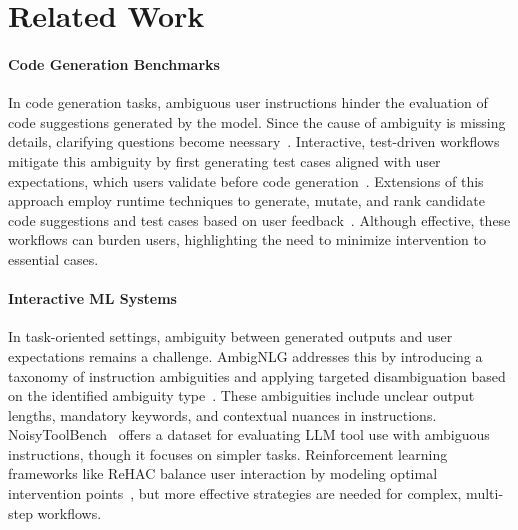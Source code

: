 \section{Related Work}
\label{sec:RelatedWorks}

\paragraph{Code Generation Benchmarks}
In code generation tasks,
ambiguous user instructions hinder the evaluation of code
suggestions generated by the model. Since the cause of
ambiguity is missing details, clarifying questions become
neessary~\cite{mu2023clarifygptempoweringllmbasedcode}. Interactive, test-driven workflows mitigate this ambiguity by first generating test cases aligned with user expectations, which users validate before code generation~\cite{lahiri2023interactivecodegenerationtestdriven}. Extensions of this approach employ runtime techniques to generate, mutate, and rank candidate code suggestions and test cases based on user feedback~\cite{Fakhoury_2024_LLM_Code_Gen}. Although effective, these workflows can burden users, highlighting the need to minimize intervention to essential cases. 

\paragraph{Interactive ML Systems}
In task-oriented settings, ambiguity between generated outputs and user expectations remains a challenge. AmbigNLG addresses this by introducing a taxonomy of instruction ambiguities and applying targeted disambiguation based on the identified ambiguity type~\cite{ambignlp}. These ambiguities include unclear output lengths, mandatory keywords, and contextual nuances in instructions. NoisyToolBench~\cite{NoisyToolBench} offers a dataset for evaluating LLM tool use with ambiguous instructions, though it focuses on simpler tasks. Reinforcement learning frameworks like ReHAC balance user interaction by modeling optimal intervention points~\cite{feng2024largelanguagemodelbasedhumanagent}, but more effective strategies are needed for complex, multi-step workflows.

